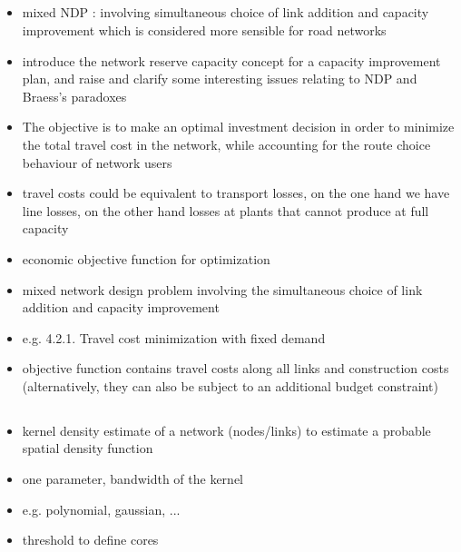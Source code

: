 \documentclass[paper=a4, fontsize=12pt]{article}
\begin{document}
\subsection*{\citeauthor{Yang1998} \cite{Yang1998}}

\begin{itemize}
\item mixed NDP : involving simultaneous choice of link addition and capacity improvement which is considered more sensible for road networks
\item introduce the network reserve capacity concept for a capacity improvement plan, and raise and clarify some interesting issues relating to NDP and Braess's paradoxes

\item The objective is to make an optimal investment decision in order to minimize the total travel cost in the network, while accounting for the route choice behaviour of network users
\item travel costs could be equivalent to transport losses, on the one hand we have line losses, on the other hand losses at plants that cannot produce at full capacity
\item economic objective function for optimization
\item mixed network design problem involving the simultaneous choice of link addition and capacity improvement

\item e.g. 4.2.1. Travel cost minimization with fixed demand
\item objective function contains travel costs along all links and construction costs (alternatively, they can also be subject to an additional budget constraint)
\end{itemize}

\subsection*{\citeauthor{Liu2010} \cite{Liu2010}}

\begin{itemize}
\item kernel density estimate of a network (nodes/links) to estimate a probable spatial density function
\item one parameter, bandwidth of the kernel
\item e.g. polynomial, gaussian, ...
\item threshold to define cores
\end{itemize}




\end{document}
